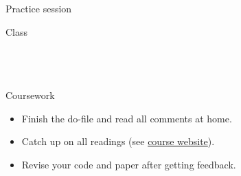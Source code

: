 \documentclass[t]{beamer}
\begin{document}
	\begin{frame}[t]{Practice session}

    \begin{block}{Class}
      \\
      \\
      
			\\
			\\    
    \end{block}

    \begin{alertblock}{Coursework}
      \begin{itemize}
	       \item Finish the do-file and read all comments at home.
	       \item Catch up on all readings %
				 	(see \href{http://f.briatte.org/teaching/quanti/}%
				 	{course website}).
	       \item Revise your code and paper after getting feedback.
      \end{itemize}
    \end{alertblock}
    		
	\end{frame}
	
\end{document}
